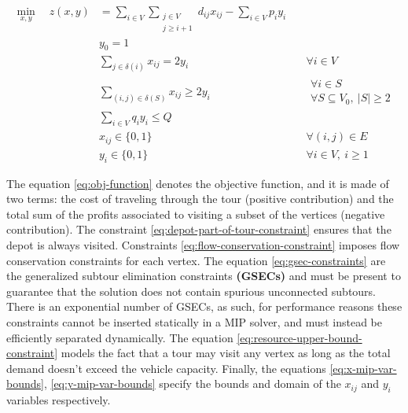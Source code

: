 \begin{align}
	\min_{x,y} \quad z(x, y) & =  \sum_{i \in V} \sum_{\substack{j \in V                                                                                 \\ j \ge i + 1}} d_{ij} x_{ij} - \sum_{i \in V} p_i y_i \label{eq:obj-function}\\
	                         & y_0 = 1                                           & \label{eq:depot-part-of-tour-constraint}                              \\
	                         & \sum_{j \in \delta(i)}       x_{ij}  = 2 y_i      & \quad \forall i \in V         \label{eq:flow-conservation-constraint} \\
	                         & \sum_{(i, j) \in \delta(S)} x_{ij} \ge 2 y_{i}    & \quad \substack{\forall i \in S                                       \\ \forall S \subseteq V_0,\ |S| \ge 2} \label{eq:gsec-constraints} \\
	                         & \sum_{i \in V} q_i y_i   \le Q                    & \label{eq:resource-upper-bound-constraint}                            \\
	                         & x_{ij}                   \in \lbrace 0, 1 \rbrace & \quad \forall (i, j) \in E               \label{eq:x-mip-var-bounds}  \\
	                         & y_{i}                    \in \lbrace 0, 1 \rbrace & \quad \forall i \in V,\ i \ge 1          \label{eq:y-mip-var-bounds}
\end{align}

The equation \eqref{eq:obj-function} denotes the objective function, and it is made of two terms: the cost of traveling through the tour (positive contribution) and the total sum of the profits associated to visiting a subset of the vertices (negative contribution).
The constraint \eqref{eq:depot-part-of-tour-constraint} ensures that the depot is always visited.
Constraints \eqref{eq:flow-conservation-constraint} imposes flow conservation constraints for each vertex.
The equation \eqref{eq:gsec-constraints} are the generalized subtour elimination constraints \textbf{(GSECs)} and must be present to guarantee that the solution does not contain spurious unconnected subtours.
There is an exponential number of GSECs, as such, for performance reasons these constraints cannot be inserted statically in a MIP solver, and must instead be efficiently separated dynamically.
The equation \eqref{eq:resource-upper-bound-constraint} models the fact that a tour may visit any vertex as long as the total demand doesn't exceed the vehicle capacity.
Finally, the equations \eqref{eq:x-mip-var-bounds}, \eqref{eq:y-mip-var-bounds} specify the bounds and domain of the $x_{ij}$ and $y_{i}$ variables respectively.

